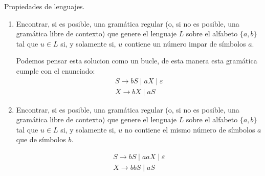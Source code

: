 \documentclass[12pt]{book} %
\begin{document}
\begin{ejercicio}
Propiedades de lenguajes.

\begin{enumerate}[label=\alph*)]
    \item Encontrar, si es posible, una gramática regular (o, si no es posible, una gramática libre de contexto) que genere el lenguaje $L$ sobre el alfabeto $\{a, b\}$ tal que $u \in L$ si, y solamente si, $u$ contiene un número impar de símbolos $a$.

    \begin{solucion}[a)]
    Podemos pensar esta solucion como un bucle, de esta manera esta gramática cumple con el enunciado:
    \begin{align*}
        S \rightarrow bS \mid aX \mid \varepsilon \\
        X \rightarrow bX \mid aS 
    \end{align*}
    \end{solucion}

    \item Encontrar, si es posible, una gramática regular (o, si no es posible, una gramática libre de contexto) que genere el lenguaje $L$ sobre el alfabeto $\{a, b\}$ tal que $u \in L$ si, y solamente si, $u$ no contiene el mismo número de símbolos $a$ que de símbolos $b$.

    \begin{solucion}[b)]
    \begin{align*}
        S \rightarrow bS \mid aaX \mid \varepsilon \\
        X \rightarrow bbS \mid aS  
    \end{align*}
    \end{solucion}


\end{enumerate}

\end{ejercicio}
\end{document}
